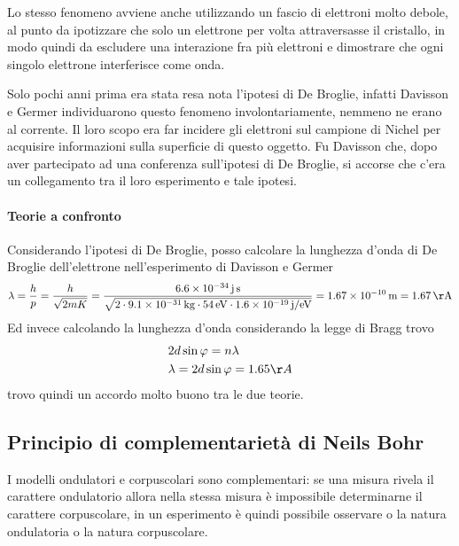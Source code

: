 Lo stesso fenomeno avviene anche utilizzando un fascio di elettroni molto debole, al punto da ipotizzare che solo un elettrone per volta attraversasse il cristallo, in modo quindi da escludere una interazione fra più elettroni e dimostrare che ogni singolo elettrone interferisce come onda.

Solo pochi anni prima era stata resa nota l'ipotesi di De Broglie, infatti Davisson e Germer individuarono questo fenomeno involontariamente, nemmeno ne erano al corrente.
Il loro scopo era far incidere gli elettroni sul campione di Nichel per acquisire informazioni sulla superficie di questo oggetto.
Fu Davisson che, dopo aver partecipato ad una conferenza sull'ipotesi di De Broglie, si accorse che c'era un collegamento tra il loro esperimento e tale ipotesi.

\paragraph{Teorie a confronto}
Considerando l'ipotesi di De Broglie, posso calcolare la lunghezza d'onda di De Broglie dell'elettrone nell'esperimento di Davisson e Germer
\begin{equation}
\lambda = \frac{ h}{p } = \frac{ h}{\sqrt{2mK} } 
= \frac{\SI{6.6e-34}{j.s} }{\sqrt{ 2 \cdot \SI{9.1e-31}{kg} \cdot \SI{54}{eV} \cdot \SI{1.6e-19}{j / eV} } } 
= \SI{1.67e-10}{m} = \SI{1.67}{\AA}
\end{equation}
Ed invece calcolando la lunghezza d'onda considerando la legge di Bragg trovo
\begin{equation}
\begin{split}
& 2 d \sin \varphi = n \lambda \\
& \lambda = 2 d \sin \varphi = 1.65 \AA
\end{split}
\end{equation}
trovo quindi un accordo molto buono tra le due teorie.





\subsection{Principio di complementarietà di Neils Bohr}
I modelli ondulatori e corpuscolari sono complementari: se una misura rivela il carattere ondulatorio allora nella stessa misura è impossibile determinarne il carattere corpuscolare, in un esperimento è quindi possibile osservare o la natura ondulatoria o la natura corpuscolare.

